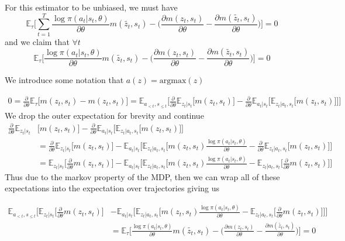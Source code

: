 \documentclass{article}
\newcommand{\E}{\mathbb{E}}
\newcommand{\LL}[1]{\frac{\log \pi(a_{#1}| s_{#1}, \theta)}{\partial \theta}}
\newcommand{\PT}{\frac{\partial}{\partial \theta}}
\begin{document}
For this estimator to be unbiased, we must have $$\E_\tau\Big[\sum_{t=1}^T \LL{t} m(\tilde{z_t}, s_t) - \Big(\frac{\partial m(z_t, s_t)}{\partial\theta} - \frac{\partial m(\tilde{z_t}, s_t)}{\partial\theta}\Big)\Big] = 0$$ and we claim that $\forall t$  $$\E_\tau\Big[ \LL{t} m(\tilde{z_t}, s_t) - \Big(\frac{\partial m(z_t, s_t)}{\partial\theta} - \frac{\partial m(\tilde{z_t}, s_t)}{\partial\theta}\Big)\Big] = 0$$ 

We introduce some notation that $a(z) = \text{argmax}(z)$

\begin{align}
0 = \PT \E_\tau\Big[ m(z_t, s_t) - m(z_t, s_t) \Big] = \E_{a_{<t},s_{\leq t}}\Big[ \PT \E_{z_t|s_t} \Big[ m(z_t, s_t) \Big] -  \PT \E_{a_t|s_t} \Big[ \E_{z_t|a_t, s_t}\Big[ m(z_t, s_t)\Big] \Big]\Big]
\end{align}
We drop the outer expectation for brevity and continue
\begin{align}
\PT \E_{z_t|s_t} &\Big[ m(z_t, s_t) \Big] -  \PT \E_{a_t|s_t} \Big[ \E_{z_t|a_t, s_t}\Big[ m(z_t, s_t)\Big] \Big]\\
&= \PT \E_{z_t|s_t} \Big[ m(z_t, s_t) \Big] - \E_{a_t|s_t} \Big[ \E_{z_t|a_t, s_t}\Big[m(z_t, s_t) \LL{t} -\PT \E_{z_t|a_t, s_t}\Big[m(z_t, s_t)  \Big] \Big]\\
&= \E_{z_t|s_t} \Big[ \PT m(z_t, s_t) \Big] - \E_{a_t|s_t} \Big[ \E_{z_t|a_t, s_t}\Big[m(z_t, s_t) \LL{t} - \E_{z_t|a_t, s_t}\Big[\PT m(z_t, s_t)  \Big] \Big]
\end{align}
Thus due to the markov property of the MDP, then we can wrap all of these expectations into the expectation over trajectories giving us

\begin{align}
\E_{a_{<t},s_{\leq t}}\Big[\E_{z_t|s_t} \Big[ \PT m(z_t, s_t) \Big] &- \E_{a_t|s_t} \Big[ \E_{z_t|a_t, s_t}\Big[m(z_t, s_t) \LL{t} - \E_{z_t|a_t, s_t}\Big[\PT m(z_t, s_t)  \Big] \Big]\Big]\\
&= \E_\tau\Big[ \LL{t} m(\tilde{z_t}, s_t) - \Big(\frac{\partial m(z_t, s_t)}{\partial\theta} - \frac{\partial m(\tilde{z_t}, s_t)}{\partial\theta}\Big)\Big] = 0
\end{align}

\end{document}
